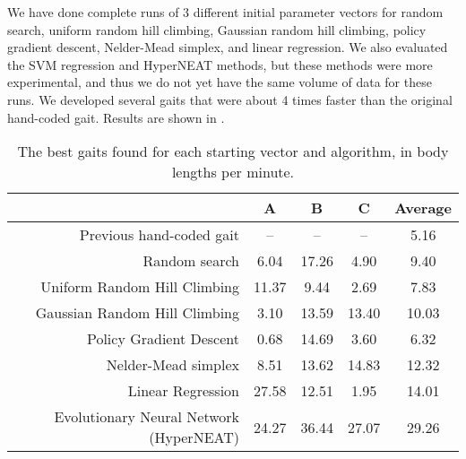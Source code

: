 
We have done complete runs of 3 different initial parameter vectors
for random search, uniform random hill climbing, Gaussian random hill
climbing, policy gradient descent, Nelder-Mead simplex, and linear
regression.  We also evaluated the SVM regression and HyperNEAT
methods, but these methods were more experimental, and thus we do not
yet have the same volume of data for these runs.  We developed several
gaits that were about 4 times faster than the original hand-coded
gait.  Results are shown in .



\begin{table*}
\begin{center}
\begin{tabular}{|r|c|c|c||c|}
\hline
                                         & A       & B      & C      &  Average \\
\hline                                                               
\hline                                                               
Previous hand-coded gait                 & --      & --     & --     &  5.16 \\
\hline                                                                 
Random search                            & 6.04    & 17.26  & 4.90   &  9.40 \\
\hline                                                                 
Uniform Random Hill Climbing             & 11.37   & 9.44   & 2.69   &  7.83 \\
\hline                                                                 
Gaussian Random Hill Climbing            & 3.10    & 13.59  & 13.40  &  10.03 \\
\hline                                                                 
Policy Gradient Descent                  & 0.68    & 14.69  & 3.60   &  6.32 \\
\hline                                                                 
Nelder-Mead simplex                      & 8.51    & 13.62  & 14.83  &  12.32 \\
\hline                                                                 
Linear Regression                        & 27.58   & 12.51  & 1.95   &  14.01 \\
\hline                                                                
Evolutionary Neural Network (HyperNEAT)  & 24.27     & 36.44    & 27.07   & 29.26  \\
\hline
\end{tabular}
\caption{The best gaits found for each starting vector and algorithm,
  in body lengths per minute.}
\end{center}
\end{table*}



